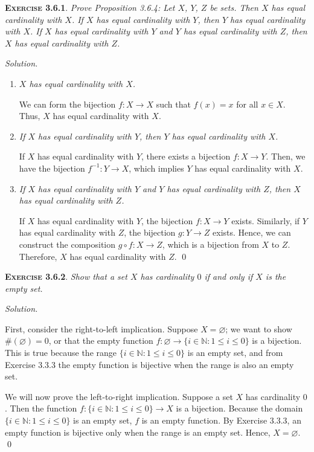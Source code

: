 \documentclass[12pt]{article}
\theoremstyle{remark}
\newenvironment{exer}[2]{
    \noindent \setlength{\parskip}{1em}%
    \textsc{\textbf{Exercise #1}}. \textit{#2} \par
    \noindent \textit{Solution.} %
}{\bigskip}
\begin{document}
\begin{exer}{3.6.1}{
    Prove Proposition 3.6.4:
    Let $X$, $Y$, $Z$ be sets.
    Then $X$ has equal cardinality with $X$.
    If $X$ has equal cardinality with $Y$, then $Y$ has equal cardinality with $X$.
    If $X$ has equal cardinality with $Y$ and $Y$ has equal cardinality with $Z$, then $X$ has equal cardinality with $Z$.
}
    \begin{enumerate}[topsep=0mm,label=(\alph*)]
        \item \textit{$X$ has equal cardinality with $X$.}

            We can form the bijection $f : X \to X$ such that $f(x) = x$ for all $x \in X$.
            Thus, $X$ has equal cardinality with $X$.
            
        \item \textit{If $X$ has equal cardinality with $Y$, then $Y$ has equal cardinality with $X$.}
        
            If $X$ has equal cardinality with $Y$, there exists a bijection $f : X \to Y$.
            Then, we have the bijection $f^{-1} : Y \to X$, which implies $Y$ has equal cardinality with $X$.

        \item \textit{If $X$ has equal cardinality with $Y$ and $Y$ has equal cardinality with $Z$, then $X$ has equal cardinality with $Z$.}

            If $X$ has equal cardinality with $Y$, the bijection $f : X \to Y$ exists.
            Similarly, if $Y$ has equal cardinality with $Z$, the bijection $g : Y \to Z$ exists.
            Hence, we can construct the composition $g \circ f : X \to Z$, which is a bijection from $X$ to $Z$.
            Therefore, $X$ has equal cardinality with $Z$. \qed
    \end{enumerate}
\end{exer}


\begin{exer}{3.6.2}{
    Show that a set $X$ has cardinality $0$ if and only if $X$ is the empty set.
}
    First, consider the right-to-left implication.
    Suppose $X = \varnothing$; we want to show $\#(\varnothing) = 0$, or that the empty function $f : \varnothing \to \{i \in \mathbb{N} : 1 \le i \le 0 \}$ is a bijection.
    This is true because the range $\{i \in \mathbb{N} : 1 \le i \le 0 \}$ is an empty set, and from Exercise 3.3.3 the empty function is bijective when the range is also an empty set.

    We will now prove the left-to-right implication.
    Suppose a set $X$ has cardinality $0$.
    Then the function $f : \{i \in \mathbb{N} : 1 \le i \le 0 \} \to X$ is a bijection.
    Because the domain $\{i \in \mathbb{N} : 1 \le i \le 0 \}$ is an empty set, $f$ is an empty function.
    By Exercise 3.3.3, an empty function is bijective only when the range is an empty set.
    Hence, $X = \varnothing$. \qed    
\end{exer}
\end{document}

